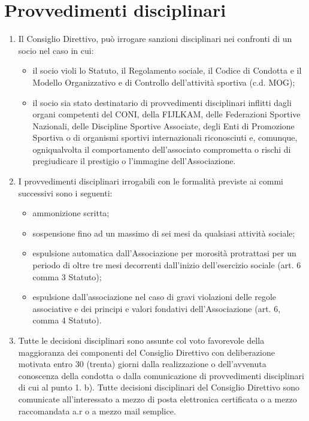 \documentclass{djtsdoc}
\begin{document}
	\section{Provvedimenti disciplinari}
	\begin{enumerate}
		\item Il Consiglio Direttivo, può irrogare sanzioni disciplinari nei confronti di un socio nel caso in cui:
		\begin{itemize}
			\item il socio violi lo Statuto,  il Regolamento sociale, il Codice di Condotta e il Modello Organizzativo e di Controllo dell'attività sportiva (c.d. MOG);
			\item il socio sia stato destinatario di provvedimenti disciplinari inflitti dagli organi competenti del CONI, della FIJLKAM, delle Federazioni Sportive Nazionali, delle Discipline Sportive Associate, degli Enti di Promozione Sportiva o di organismi sportivi internazionali riconosciuti e, comunque, ogniqualvolta il comportamento dell'associato comprometta o rischi di pregiudicare il prestigio o l'immagine dell'Associazione.
		\end{itemize}
		\item I provvedimenti disciplinari irrogabili con le formalità previste ai commi successivi sono i seguenti:
		\begin{itemize}
			\item ammonizione scritta;
			\item sospensione fino ad un massimo di sei mesi da qualsiasi attività sociale;
			\item espulsione automatica dall'Associazione per morosità protrattasi per un periodo di oltre tre mesi decorrenti dall'inizio dell'esercizio sociale (art. 6 comma 3 Statuto);
			\item espulsione dall'associazione nel caso di gravi violazioni delle regole associative e dei principi e valori fondativi dell'Associazione (art. 6, comma 4 Statuto). 
		\end{itemize}
		\item Tutte le decisioni disciplinari sono assunte col voto favorevole della maggioranza dei componenti del Consiglio Direttivo con deliberazione motivata entro 30 (trenta) giorni dalla realizzazione o dell'avvenuta conoscenza della condotta o dalla comunicazione di provvedimenti disciplinari di cui al punto 1. b). Tutte  decisioni disciplinari  del Consiglio Direttivo sono comunicate all'interessato a mezzo di posta elettronica certificata o a mezzo raccomandata a.r o a mezzo mail semplice.

\end{enumerate}
\end{document}
